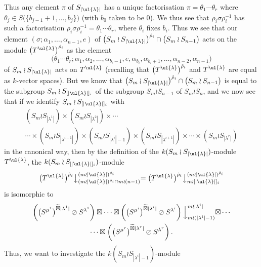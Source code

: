 Thus any element $\pi$ of $S_{|\ul{\lambda}|}$ has a unique factorisation $\pi = \theta_1\cdots\theta_r$ where
$\theta_j \in S\bigl(\{b_{j-1}+1,\ldots,b_j\}\bigr)$ (with $b_0$ taken to be 0). We thus see that $\rho_i\sigma\rho_i^{-1}$ has such a
factorisation $\rho_i\sigma\rho_i^{-1} = \theta_1\cdots\theta_r$, where $\theta_i$ fixes $b_i$. 
Thus we see that our element
$(\sigma;\alpha_1,\ldots,\alpha_{n-1},e)$ of $\bigl(S_m \wr S_{|\ul{\lambda}|}\bigr)^{\hat\rho_i}\cap\bigl(S_m \wr S_{n-1}\bigr)$ acts on the
module $\bigl(T^{\ul{\lambda}}\bigr)^{\hat\rho_i}$ as the element
\[
\bigl(\theta_1\cdots\theta_r;\alpha_1,\alpha_2,\ldots,\alpha_{b_i-1},e,\alpha_{b_i},\alpha_{b_i+1},\ldots,\alpha_{n-2},\alpha_{n-1}\bigr)
\]
of $S_m \wr S_{|\ul{\lambda}|}$ acts on $T^{\ul{\lambda}}$ (recalling that $\bigl(T^{\ul{\lambda}}\bigr)^{\hat\rho_i}$ and $T^{\ul{\lambda}}$ are equal
as $k$-vector spaces). But we know that $\bigl(S_m \wr S_{|\ul{\lambda}|}\bigr)^{\hat\rho_i}\cap\bigl(S_m \wr S_{n-1}\bigr)$ is equal to the
subgroup $S_m \wr S_{[|\ul{\lambda}|]_i}$ of the subgroup $S_m \wr S_{n-1}$ of $S_m \wr S_n$, and we now see that if we identify
$S_m \wr S_{[|\ul{\lambda}|]_i}$ with
\begin{multline*}
(S_m \wr S_{|\lambda^1|})\times(S_m \wr S_{|\lambda^2|})\times\cdots\\
\cdots\times
(S_m \wr S_{|\lambda^{i-1}|})\times(S_m \wr S_{|\lambda^i|-1})\times(S_m \wr S_{|\lambda^{i+1}|})\times\cdots\times
(S_m \wr S_{|\lambda^r|})
\end{multline*}
in the canonical way, then by the definition of the $k(S_m \wr S_{|\ul{\lambda}|})$-module $T^{\ul{\lambda}}$, the
$k(S_m \wr S_{[|\ul{\lambda}|]_i})$-module
\[
\bigl(T^{\ul{\lambda}}\bigr)^{\hat\rho_i}\bigl\downarrow^{(m{\wr}|\ul{\lambda}|)^{\hat\rho_i}}_{(m{\wr}|\ul{\lambda}|)^{\hat\rho_i} \cap m \wr (n-1)}
=
\bigl(T^{\ul{\lambda}}\bigr)^{\hat\rho_i}\bigl\downarrow^{(m{\wr}|\ul{\lambda}|)^{\hat\rho_i}}_{m \wr [|\ul{\lambda}|]_i}
\]
is isomorphic to
\begin{multline}\label{T_ul_lambd_isom_in_place_res:eq}
\left(\bigl(S^{\mu^1}\bigr)^{\widetilde\boxtimes |\lambda^1|}\oslash S^{\lambda^1}\right)\boxtimes\cdots\boxtimes
\left(\bigl(S^{\mu^i}\bigr)^{\widetilde\boxtimes |\lambda^i|}\oslash S^{\lambda^i}\right)\Bigl\downarrow^{m \wr |\lambda^i|}_{m \wr (|\lambda^i|-1)}
\boxtimes\cdots\\
\cdots\boxtimes
\left(\bigl(S^{\mu^r}\bigr)^{\widetilde\boxtimes |\lambda^r|}\oslash S^{\lambda^r}\right).
\end{multline}
Thus, we want to investigate the $k(S_m \wr S_{|\lambda^i|-1})$-module
